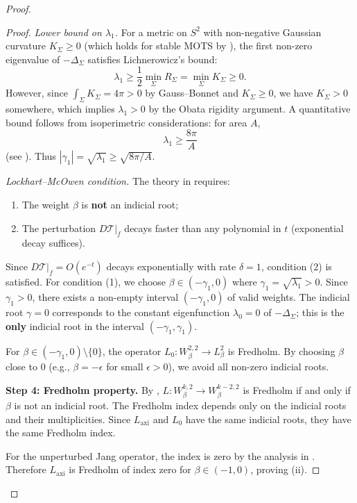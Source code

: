 \documentclass[12pt]{article}
\theoremstyle{plain}
\theoremstyle{definition}
\theoremstyle{remark}
\begin{document}
\begin{proof}
\begin{proof}
\textit{Lower bound on $\lambda_1$.} For a metric on $S^2$ with non-negative Gaussian curvature $K_\Sigma \geq 0$ (which holds for stable MOTS by \cite{gallowayschoen2006}), the first non-zero eigenvalue of $-\Delta_\Sigma$ satisfies Lichnerowicz's bound:
\[
\lambda_1 \geq \frac{1}{2}\min_\Sigma R_\Sigma = \min_\Sigma K_\Sigma \geq 0.
\]
However, since $\int_\Sigma K_\Sigma = 4\pi > 0$ by Gauss--Bonnet and $K_\Sigma \geq 0$, we have $K_\Sigma > 0$ somewhere, which implies $\lambda_1 > 0$ by the Obata rigidity argument. A quantitative bound follows from isoperimetric considerations: for area $A$,
\[
\lambda_1 \geq \frac{8\pi}{A}
\]
(see \cite[Section 3.2]{chavel1984}). Thus $|\gamma_1| = \sqrt{\lambda_1} \geq \sqrt{8\pi/A}$.

\textit{Lockhart--McOwen condition.} The theory in \cite[Theorem 1.1]{lockhartmccowen1985} requires:
\begin{enumerate}
    \item The weight $\beta$ is \textbf{not} an indicial root;
    \item The perturbation $D\mathcal{T}|_f$ decays faster than any polynomial in $t$ (exponential decay suffices).
\end{enumerate}

Since $D\mathcal{T}|_f = O(e^{-t})$ decays exponentially with rate $\delta = 1$, condition (2) is satisfied. For condition (1), we choose $\beta \in (-\gamma_1, 0)$ where $\gamma_1 = \sqrt{\lambda_1} > 0$. Since $\gamma_1 > 0$, there exists a non-empty interval $(-\gamma_1, 0)$ of valid weights. The indicial root $\gamma = 0$ corresponds to the constant eigenfunction $\lambda_0 = 0$ of $-\Delta_\Sigma$; this is the \textbf{only} indicial root in the interval $(-\gamma_1, \gamma_1)$.

For $\beta \in (-\gamma_1, 0) \setminus \{0\}$, the operator $L_0: W^{2,2}_\beta \to L^2_\beta$ is Fredholm. By choosing $\beta$ close to $0$ (e.g., $\beta = -\epsilon$ for small $\epsilon > 0$), we avoid all non-zero indicial roots.

\textbf{Step 4: Fredholm property.}
By \cite[Theorem 1.1]{lockhartmccowen1985}, $L: W^{k,2}_\beta \to W^{k-2,2}_\beta$ is Fredholm if and only if $\beta$ is not an indicial root. The Fredholm index depends only on the indicial roots and their multiplicities. Since $L_{\mathrm{axi}}$ and $L_0$ have the same indicial roots, they have the same Fredholm index.

For the unperturbed Jang operator, the index is zero by the analysis in \cite{hankhuri2013}. Therefore $L_{\mathrm{axi}}$ is Fredholm of index zero for $\beta \in (-1, 0)$, proving (ii).


\end{proof}
\end{proof}
\end{document}
